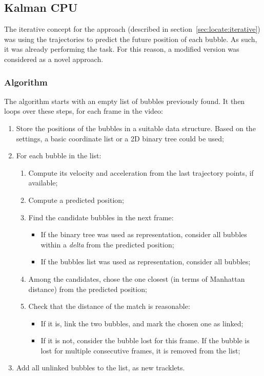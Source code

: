 \subsection{Kalman CPU}
\label{sec:link2d:kalman-cpu}

The iterative concept for the \locate* approach (described in section~\ref{sec:locate:iterative}) was using the trajectories to predict the future position of each bubble.
As such, it was already performing the \linkDD* task.
For this reason, a modified version was considered as a novel \linkDD* approach.

\subsubsection{Algorithm}

The algorithm starts with an empty list of bubbles previously found.
It then loops over these steps, for each frame in the video:
\begin{enumerate}
	\itemsep 0em
	\item Store the positions of the bubbles in a suitable data structure. Based on the settings, a basic coordinate list or a 2D binary tree could be used;
	\item For each bubble in the list:
	      \begin{enumerate}
		      \item Compute its velocity and acceleration from the last trajectory points, if available;
		      \item Compute a predicted position;
		      \item Find the candidate bubbles in the next frame:
		            \begin{itemize}
			            \item If the binary tree was used as representation, consider all bubbles within a \textit{delta} from the predicted position;
			            \item If the bubbles list was used as representation, consider all bubbles;
		            \end{itemize}
		      \item Among the candidates, chose the one closest (in terms of Manhattan distance) from the predicted position;
		      \item Check that the distance of the match is reasonable:
		            \begin{itemize}
			            \item If it is, link the two bubbles, and mark the chosen one as linked;
			            \item If it is not, consider the bubble lost for this frame. If the bubble is lost for multiple consecutive frames, it is removed from the list;
		            \end{itemize}
	      \end{enumerate}
	\item Add all unlinked bubbles to the list, as new tracklets.
\end{enumerate}
